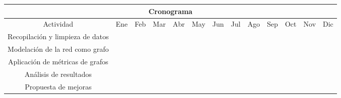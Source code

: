 \documentclass[12pt,oneside]{article}
\begin{document}
\small{
\begin{adjustbox}{center} %
\begin{tabular}{|c||*{12}{c|}}
    \hline
    \multicolumn{13}{|c|}{Cronograma} \\
    \hline
    Actividad & Ene & Feb & Mar & Abr & May & Jun & Jul & Ago & Sep & Oct & Nov & Dic \\
    \hline
    Recopilación y limpieza de datos & \cellcolor[gray]{.8} & \cellcolor[gray]{.8} &  &  &  &  &  &  &  &  &  & \\
    \hline
    Modelación de la red como grafo &  &  & \cellcolor[gray]{.8} & \cellcolor[gray]{.8} & \cellcolor[gray]{.8} &  &  &  &  &  &  & \\
    \hline
    Aplicación de métricas de grafos &  &  &  &  &  & \cellcolor[gray]{.8} & \cellcolor[gray]{.8} &  &  &  &  & \\
    \hline
    Análisis de resultados &  &  &  &  &  &  &  & \cellcolor[gray]{.8} & \cellcolor[gray]{.8} &  &  & \\
    \hline
    Propuesta de mejoras &  &  &  &  &  &  &  &  &  &  \cellcolor[gray]{.8} & \cellcolor[gray]{.8} & \cellcolor[gray]{.8} \\
    \hline
\end{tabular}
\end{adjustbox}
}
\end{document}
